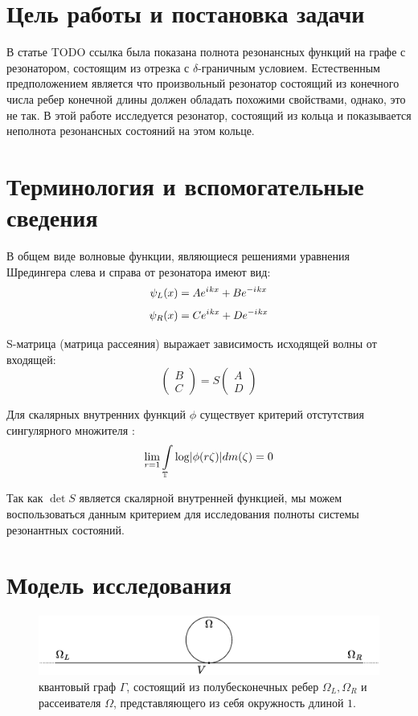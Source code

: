 \documentclass{nsart_eng}
\DeclarePairedDelimiter{\abs}{\lvert}{\rvert}
\newcommand{\eexp}[1]{e^{#1}}
\newcommand{\iu}{{i\mkern1mu}}
\begin{document}
\section{Цель работы и постановка задачи}
В статье TODO ссылка была показана полнота резонансных функций на графе с резонатором, состоящим из отрезка с $\delta$-граничным условием. Естественным предположением является что произвольный резонатор состоящий из конечного числа ребер конечной длины должен обладать похожими свойствами, однако, это не так. В этой работе исследуется резонатор, состоящий из кольца и показывается неполнота резонансных состояний на этом кольце.

\section{Терминология и вспомогательные сведения}
В общем виде волновые функции, являющиеся решениями уравнения Шредингера слева и справа от резонатора имеют вид:
\[
\psi_L(x) = A \eexp{\iu k x} + B \eexp{-\iu k x}
\]
\[
\psi_R(x) = C \eexp{\iu k x} + D \eexp{-\iu k x}
\]

S-матрица (матрица рассеяния) выражает зависимость исходящей волны от входящей:
\[
\begin{pmatrix} B \\ C \end{pmatrix} = S \begin{pmatrix} A \\ D \end{pmatrix}
\]

Для скалярных внутренних функций $\phi$ существует критерий отстутствия сингулярного множителя \cite[стр. 99]{nikolskii}:
\[
\lim\limits_{r = 1} \int\limits_{\bbT} \log \abs{\phi(r \zeta)} d m(\zeta) = 0
\]

Так как $\det S$ является скалярной внутренней функцией, мы можем воспользоваться данным критерием для исследования полноты системы резонантных состояний.

\section{Модель исследования}
\begin{figure}[!htb]
\includegraphics[width=\textwidth,keepaspectratio]{graph.eps}
\caption{квантовый граф $\Gamma$, состоящий из полубесконечных ребер $\Omega_L, \Omega_R$ и рассеивателя $\Omega$, представляющего из себя окружность длиной $1$.}
\end{figure}
\end{document}
